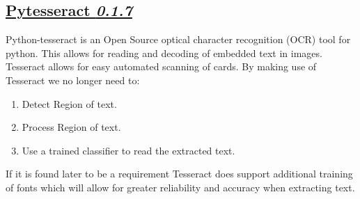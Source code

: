 \documentclass{article}
\begin{document}
		\subsection{\href{https://pypi.python.org/pypi/pytesseract}
		{Pytesseract \textit{0.1.7}}}
		Python-tesseract is an Open Source optical 
		character recognition (OCR) tool for python. This allows 
		for reading and decoding of embedded text in images.\\
		
		\noindent
		Tesseract allows for easy automated scanning of cards. By making use
		of Tesseract we no longer need to:
		\begin{enumerate}
			\item Detect Region of text.
			\item Process Region of text.
			\item Use a trained classifier to read the extracted text.
		\end{enumerate}
		If it is found later to be a requirement Tesseract does support
		additional training of fonts which will allow for greater
		reliability and accuracy when extracting text.  
	
	\cleardoublepage
\end{document}
